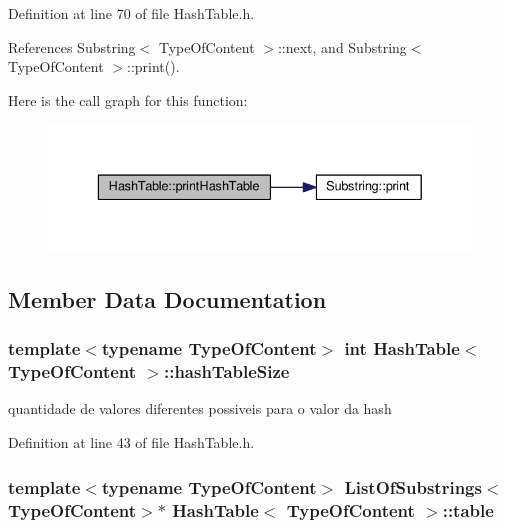Definition at line 70 of file Hash\+Table.\+h.



References Substring$<$ Type\+Of\+Content $>$\+::next, and Substring$<$ Type\+Of\+Content $>$\+::print().



Here is the call graph for this function\+:\nopagebreak
\begin{figure}[H]
\begin{center}
\leavevmode
\includegraphics[width=336pt]{classHashTable_a9575e866f5584fadffbcce7b7771c33c_cgraph}
\end{center}
\end{figure}




\subsection{Member Data Documentation}
\hypertarget{classHashTable_ac09c30fbbee3c3a526220ed51074b957}{
\subsubsection[{hash\+Table\+Size}]{\setlength{\rightskip}{0pt plus 5cm}template$<$typename Type\+Of\+Content$>$ int {\bf Hash\+Table}$<$ Type\+Of\+Content $>$\+::hash\+Table\+Size}}\label{classHashTable_ac09c30fbbee3c3a526220ed51074b957}


quantidade de valores diferentes possiveis para o valor da hash 



Definition at line 43 of file Hash\+Table.\+h.

\hypertarget{classHashTable_a1772210583a06ad2f1039e7fecbc588c}{
\subsubsection[{table}]{\setlength{\rightskip}{0pt plus 5cm}template$<$typename Type\+Of\+Content$>$ {\bf List\+Of\+Substrings}$<$Type\+Of\+Content$>$$\ast$ {\bf Hash\+Table}$<$ Type\+Of\+Content $>$\+::table}}\label{classHashTable_a1772210583a06ad2f1039e7fecbc588c}


